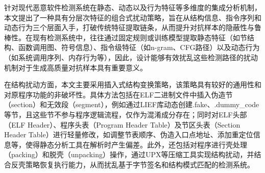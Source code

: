 
针对现代恶意软件检测系统在静态、动态以及行为特征等多维度的集成分析机制，本文提出了一种具有分层次特征的组合式扰动策略，旨在从结构信息、指令序列和动态行为三个层面入手，打破传统特征提取链条，从而提升对抗样本的隐蔽性与鲁棒性。在现有检测系统中，往往通过固定规则或训练模型提取静态特征（如节结构、函数调用图、符号信息）、指令级特征（如n-gram、CFG路径）以及动态行为（如系统调用序列、内存行为等），因此，设计能够有效扰乱这些检测路径的扰动机制对于生成高质量对抗样本具有重要意义。


在结构扰动方面，本文主要采用插入式结构变换策略，该策略具有较好的通用性和对原程序功能的非破坏性。具体方法包括在ELF二进制文件中插入伪造节（section）和无效段（segment），例如通过LIEF库\cite{LIEF2025}动态创建.fake、.dummy\_code等节，且这些节不参与程序逻辑流程，仅作为混淆成分存在；同时对ELF头部（ELF Header）、程序头表（Program Header Table）及节区头表（Section Header Table）进行轻量修改，如调整节表顺序、伪造入口点地址、添加重定位信息等，使得静态分析工具在解析时产生偏差。此外，还包括对程序进行壳处理（packing）和脱壳（unpacking）操作，通过UPX等压缩工具实现结构扰动，并结合反壳策略恢复执行能力，从而扰乱基于字节签名和结构模式匹配的检测系统。


